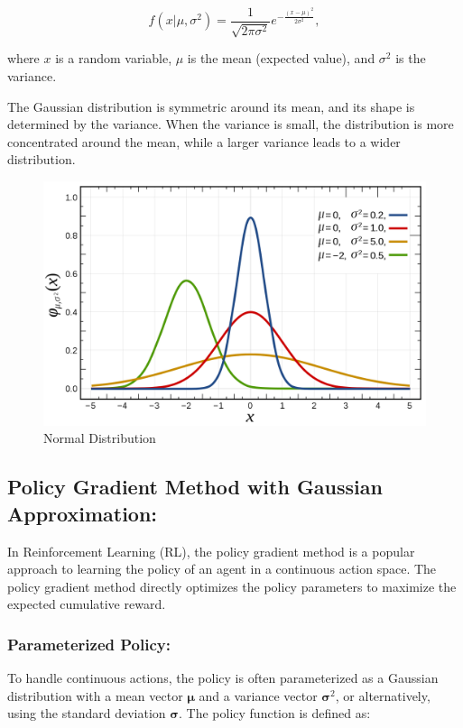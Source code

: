 \begin{equation}
    f(x | \mu, \sigma^2) = \frac{1}{\sqrt{2\pi\sigma^2}} e^{-\frac{(x-\mu)^2}{2\sigma^2}},\label{eq:equation}
\end{equation}

where $x$ is a random variable, $\mu$ is the mean (expected value), and $\sigma^2$ is the variance.

The Gaussian distribution is symmetric around its mean, and its shape is determined by the variance. When the variance is small, the distribution is more concentrated around the mean, while a larger variance leads to a wider distribution.
\begin{figure}[!h]
    \centering
    \includegraphics[width=12cm]{assets/normal}
    \caption{Normal Distribution}\label{fig:figure}
\end{figure}

\subsection*{Policy Gradient Method with Gaussian Approximation:}
In Reinforcement Learning (RL), the policy gradient method is a popular approach to learning the policy of an agent in a continuous action space. The policy gradient method directly optimizes the policy parameters to maximize the expected cumulative reward.

\subsubsection*{Parameterized Policy:}
To handle continuous actions, the policy is often parameterized as a Gaussian distribution with a mean vector $\boldsymbol{\mu}$ and a variance vector $\boldsymbol{\sigma}^2$, or alternatively, using the standard deviation $\boldsymbol{\sigma}$. The policy function is defined as:

